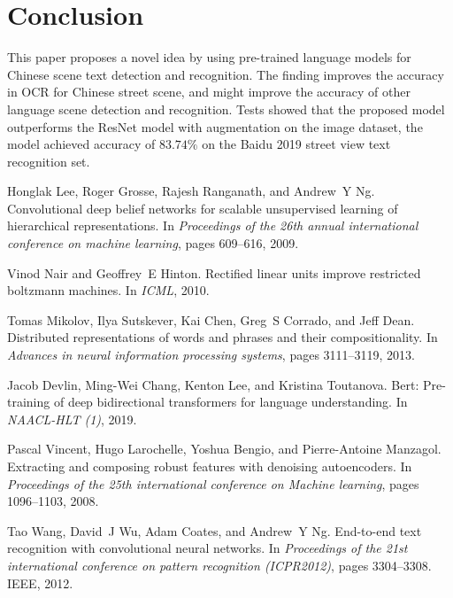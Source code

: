 \documentclass[review]{cvpr}
\begin{document}
\section{Conclusion}

This paper proposes a novel idea by using pre-trained language models for Chinese scene text detection and recognition.
The finding improves the accuracy in OCR for Chinese street scene, and might improve the accuracy of other language scene detection and recognition.
Tests showed that the proposed model outperforms the ResNet model with augmentation on the image dataset,
the model achieved accuracy of $83.74\%$ on the Baidu 2019 street view text recognition set.



{\small

%
\begin{thebibliography}{10}

Honglak Lee, Roger Grosse, Rajesh Ranganath, and Andrew~Y Ng.
\newblock Convolutional deep belief networks for scalable unsupervised learning
  of hierarchical representations.
\newblock In {\em Proceedings of the 26th annual international conference on
  machine learning}, pages 609--616, 2009.


Vinod Nair and Geoffrey~E Hinton.
\newblock Rectified linear units improve restricted boltzmann machines.
\newblock In {\em ICML}, 2010.


Tomas Mikolov, Ilya Sutskever, Kai Chen, Greg~S Corrado, and Jeff Dean.
\newblock Distributed representations of words and phrases and their
  compositionality.
\newblock In {\em Advances in neural information processing systems}, pages
  3111--3119, 2013.


Jacob Devlin, Ming-Wei Chang, Kenton Lee, and Kristina Toutanova.
\newblock Bert: Pre-training of deep bidirectional transformers for language
  understanding.
\newblock In {\em NAACL-HLT (1)}, 2019.


Pascal Vincent, Hugo Larochelle, Yoshua Bengio, and Pierre-Antoine Manzagol.
\newblock Extracting and composing robust features with denoising autoencoders.
\newblock In {\em Proceedings of the 25th international conference on Machine
  learning}, pages 1096--1103, 2008.


Tao Wang, David~J Wu, Adam Coates, and Andrew~Y Ng.
\newblock End-to-end text recognition with convolutional neural networks.
\newblock In {\em Proceedings of the 21st international conference on pattern
  recognition (ICPR2012)}, pages 3304--3308. IEEE, 2012.



\end{thebibliography}}
\end{document}
